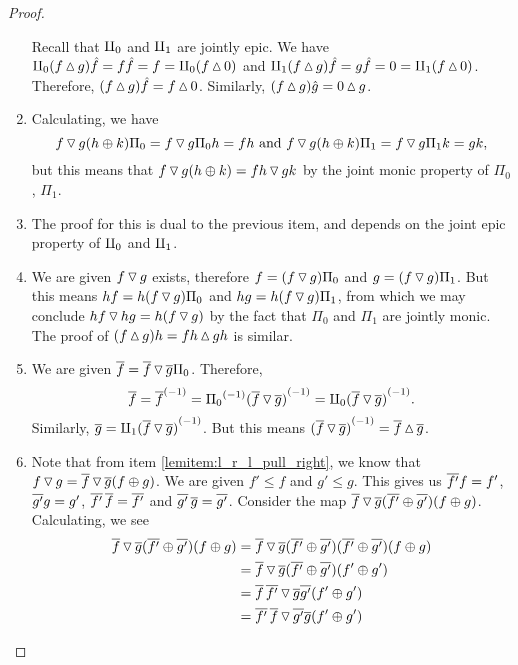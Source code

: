 \begin{proof}
\begin{enumerate}[{(}i{)}]
      Recall that $\amalg_{0}$ and $\amalg_{1}$ are jointly epic. We have
      $\amalg_{0}(f \operatorname{\vartriangle} g)\hat{f} = f\hat{f} = f = \amalg_{0}(f\operatorname{\vartriangle} 0) $ and
      $\amalg_{1}(f \operatorname{\vartriangle} g)\hat{f} = g\hat{f} = 0= \amalg_{1}(f\operatorname{\vartriangle} 0)$.
      Therefore, $(f \operatorname{\vartriangle} g)\hat{f} = f \operatorname{\vartriangle} 0$. Similarly,
      $(f \operatorname{\vartriangle} g) \hat{g} = 0 \operatorname{\vartriangle} g$.
    \item Calculating, we have
      \[
        f \operatorname{\triangledown} g (h \oplus k) \Pi_0 = f\operatorname{\triangledown} g \Pi_0 h = f h \text{ and }
        f \operatorname{\triangledown} g (h \oplus k) \Pi_1 = f\operatorname{\triangledown} g \Pi_1 k = g k,
      \]
      but this means that
      $f \operatorname{\triangledown} g (h \oplus k) = f h \operatorname{\triangledown} g k$ by the joint monic property of $\Pi_0$, $\Pi_1$.
    \item The proof for this is dual to the previous item, and depends on the joint epic property
      of $\amalg_{0}$ and $\amalg_{1}$.
    \item We are given $f\operatorname{\triangledown} g$ exists, therefore $f = (f\operatorname{\triangledown} g)\Pi_0$ and
      $g = (f\operatorname{\triangledown} g)\Pi_1$. But this means $h f = h(f\operatorname{\triangledown} g)\Pi_0$ and
      $h g = h(f\operatorname{\triangledown} g)\Pi_1$, from which we may conclude $h f \operatorname{\triangledown} h g = h(f\operatorname{\triangledown} g)$ by
      the fact that $\Pi_0$ and $\Pi_1$ are jointly monic. The proof of
      $(f\operatorname{\vartriangle} g)h = f h \operatorname{\vartriangle} g h$ is similar.
    \item We are given $\overline{f} = \overline{f}\operatorname{\triangledown}\overline{g} \Pi_0$. Therefore,
      \[
        \overline{f} = {\overline{f}}^{(-1)} = {\Pi_0}^{(-1)}{(\overline{f}\operatorname{\triangledown}\overline{g})}^{(-1)}
          = \amalg_{0} {(\overline{f}\operatorname{\triangledown}\overline{g})}^{(-1)}.
      \]
      Similarly, $\overline{g} = \amalg_{1} {(\overline{f}\operatorname{\triangledown}\overline{g})}^{(-1)}$. But this means
      ${(\overline{f}\operatorname{\triangledown}\overline{g})}^{(-1)} = \overline{f}\operatorname{\vartriangle}\overline{g}$.
    \item Note that from item \ref{lemitem:l_r_l_pull_right}, we know that
      $f \operatorname{\triangledown} g  = \overline{f} \operatorname{\triangledown} \overline{g} (f\oplus g)$. We are given $f' \le f$ and $g' \le g$. This
      gives us $\overline{f'}f =f'$, $\overline{g'}g =g'$, $\overline{f'}\,\overline{f} =\overline{f'}$ and
      $\overline{g'}\,\overline{g} =\overline{g'}$. Consider the map
      $\overline{f} \operatorname{\triangledown} \overline{g} (\overline{f'}\oplus\overline{g'})(f\oplus g)$. Calculating, we see
      \begin{align*}
        \rst{f} \tjleft \rst{g} (\rst{f'}\+\rst{g'})(f\+g)
          &= \rst{f} \tjleft \rst{g} (\rst{f'}\+\rst{g'})(\rst{f'}\+\rst{g'})(f\+g) \\
          & = \rst{f} \tjleft \rst{g} (\rst{f'}\+\rst{g'})(f'\+g') \\
          & = \rst{f}\,\rst{f'} \tjleft \rst{g} \rst{g'} (f'\+g') \\
          & = \rst{f'}\,\rst{f} \tjleft \rst{g'} \rst{g} (f'\+g') \\

\end{align*}
\end{enumerate}
\end{proof}
